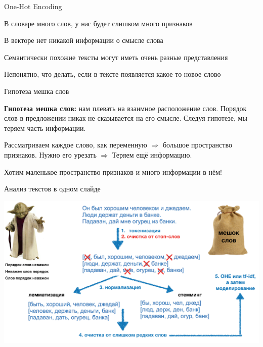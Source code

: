 \documentclass[notes,12pt, aspectratio=169]{beamer}
\newenvironment{wideitemize}{\itemize\addtolength{\itemsep}{10pt}}{\enditemize}
\begin{document}
\begin{frame}{One-Hot Encoding}
\begin{wideitemize} 
	\item  В словаре много слов, у нас будет слишком много признаков
	\item  В векторе нет никакой информации о смысле слова
	\item  Семантически похожие тексты могут иметь очень разные представления
	\item  Непонятно, что делать, если в тексте появляется какое-то новое слово
\end{wideitemize}
\end{frame} 


\begin{frame}{Гипотеза мешка слов}
	\begin{wideitemize} 
		\item \textbf{Гипотеза мешка слов:} нам плевать на взаимное расположение слов. Порядок слов в предложении никак не сказывается на его смысле. 	{\color{red}  Следуя гипотезе, мы теряем часть информации.}
		
		\item Рассматриваем каждое слово, как переменную $\Rightarrow$ большое пространство признаков. Нужно его урезать $\Rightarrow$ 	{\color{red}  Теряем ещё информацию.}
		
		\item Хотим маленькое пространство признаков и много информации в нём!
	\end{wideitemize}
\end{frame} 


\begin{frame}{Анализ текстов в одном слайде}
\begin{center}
	\includegraphics[width=.95\linewidth]{classic_text.png}
\end{center}
\end{frame} 
\end{document}
